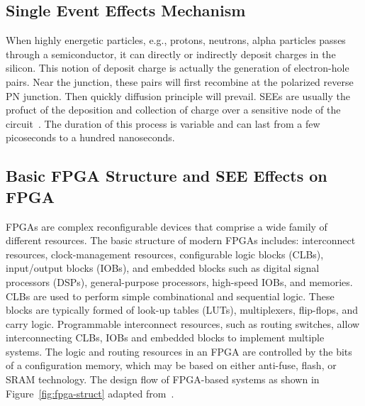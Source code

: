 \subsection{Single Event Effects Mechanism}


When highly energetic particles, e.g., protons, neutrons, alpha particles passes through a semiconductor, it can directly or indirectly deposit charges in the silicon. This notion of deposit
charge is actually the generation of electron-hole pairs. Near the junction, these
pairs will first recombine at the polarized reverse PN junction.  Then quickly diffusion principle will prevail. SEEs are usually the profuct of the deposition and collection of charge over a sensitive node of the circuit~\citep{manuzzato2010single}. The duration of this
process is variable and can last from a few picoseconds to a hundred
nanoseconds.


\subsection{Basic FPGA Structure and SEE Effects on FPGA}



FPGAs are complex reconfigurable devices that comprise a wide family of different resources. The basic structure of modern FPGAs includes: interconnect resources, clock-management resources, configurable logic blocks (CLBs), input/output
blocks (IOBs), and embedded blocks such as digital signal processors (DSPs), general-purpose processors, high-speed IOBs, and memories. CLBs are used to perform simple
combinational and sequential logic. These blocks are typically formed of look-up tables
(LUTs), multiplexers, flip-flops, and carry logic. Programmable interconnect resources, such
as routing switches, allow interconnecting CLBs, IOBs and embedded blocks to implement multiple systems.
The logic and routing resources in an FPGA are controlled by the bits of a configuration memory, which may be based on either anti-fuse, flash, or SRAM technology. The
design flow of FPGA-based systems as shown in Figure~\ref{fig:fpga-struct} adapted from~\citep{hauck2010reconfigurable}.



